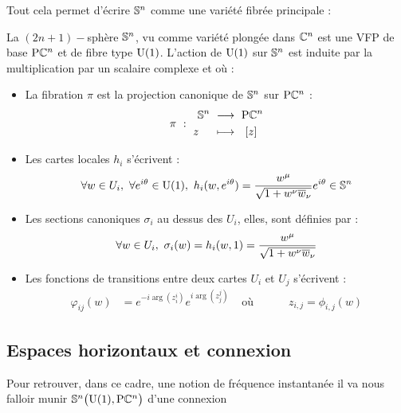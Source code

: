 Tout cela permet d'écrire $\S{n}$ comme une variété fibrée principale :
\begin{proposition}
	La $(2n+1)-$sphère $\S{n}$, vu comme variété plongée dans $\C^n$ est une VFP de base $\PC{n}$ et de fibre type $\U{1}$. L'action de $\U{1}$ sur $\S{n}$ est induite par la multiplication par un scalaire complexe et où :
	\begin{itemize}
		\item La fibration $\pi$ est la projection canonique de $\S{n}$ sur $\PC{n}$ :
		\begin{equation}
			\pi\ :\ \begin{aligned} \S{n}\ &\lr\ \PC{n} \\ z\quad\ &\lmt\ \ [z]\end{aligned}
		\end{equation}
		
		\item Les cartes locales $h_i$ s'écrivent :
		\begin{equation}
			\forall w \in U_i,\ \forall e^{i\theta}\in\U{1},\  h_i(w,e^{i\theta}) = \frac{w^\mu}{\sqrt{1 + w^\nu \congu{w}_\nu}}e^{i\theta} \in \S{n}
		\end{equation}
		
		\item Les sections canoniques $\sigma_i$ au dessus des $U_i$, elles,  sont définies par :
		\begin{equation}
			\forall w \in U_i,\ \sigma_i(w) = h_i(w, 1) = \frac{w^\mu}{\sqrt{1 + w^\nu \congu{w}_\nu}}
		\end{equation}
		
		\item Les fonctions de transitions entre deux cartes $U_i$ et $U_j$ s'écrivent :
		\begin{align}
			\varphi_{ij}(w) &= e^{-i \arg (z_i^i)} e^{i \arg (z_j^j)}  &  \text{ où }&\qquad z_{i,j} = \phi_{i,j}(w)
		\end{align}
	\end{itemize}
\end{proposition}
\skipl




\subsection{Espaces horizontaux et connexion}\label{subsec:connexion2VFP}

Pour retrouver, dans ce cadre, une notion de fréquence instantanée il va nous falloir munir $\VFP$ d'une connexion

